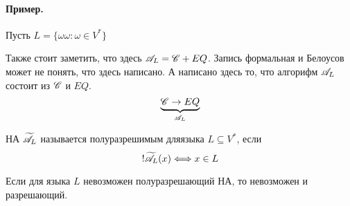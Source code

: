 \paragraph*{Пример.} Пусть $L = \{\omega\omega: \omega \in V^{*}\} $ 


Также стоит заметить, что здесь $\mathscr{A}_L = \mathscr{C} + EQ$. Запись формальная и Белоусов
может не понять, что здесь написано. А написано здесь то, что алгорифм $\mathscr{A}_L$ состоит
из $\mathscr{C}$ и $EQ$.
\[
\underbrace{\mathscr{C} \to EQ}_{\mathscr{A}_L}
\] 

\begin{definition}
НА $\widetilde{\mathscr{A}_L}$ называется полуразрешимым для\newline языка $L \subseteq V^{*}$, если
\[
!\widetilde{\mathscr{A}_L}(x) \Longleftrightarrow x \in L\\
\] 
\end{definition}

\begin{theorem}
Если для языка $L$ невозможен полуразрешающий НА, то невозможен и разрешающий.
\end{theorem}


